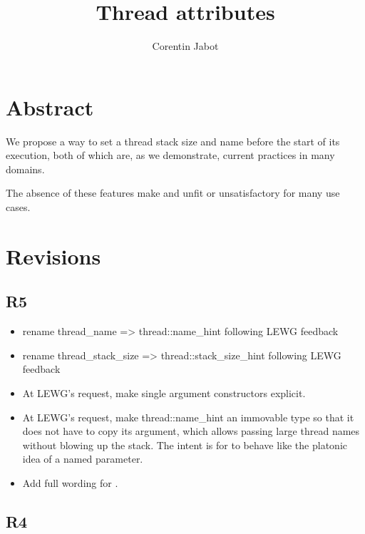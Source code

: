 \documentclass{wg21}
\title{Thread attributes}
\author{Corentin Jabot}{corentin.jabot@gmail.com}
\begin{document}
\maketitle

\setlength{\arrayrulewidth}{0.2mm}
\setlength{\tabcolsep}{8pt}
\renewcommand{\arraystretch}{1.}

\def\changemargin#1#2{\list{}{\rightmargin#2\leftmargin#1}\item[]}
\let\endchangemargin=\endlist
\setlength\extrarowheight{5pt}


\section{Abstract}

We propose a way to set a thread stack size and name before the start of its execution, both of which are,
as we demonstrate, current practices in many domains.

The absence of these features make  and  unfit or unsatisfactory for many use cases.

\section{Revisions}

\subsection{R5}

\begin{itemize}
\item rename thread_name => thread::name_hint following LEWG feedback
\item rename thread_stack_size => thread::stack_size_hint following LEWG feedback
\item At LEWG's request, make single argument constructors explicit.
\item At LEWG's request, make thread::name_hint an immovable type so that it does not have to copy its argument, which allows passing large thread names without blowing up the stack.
      The intent is for  to behave like the platonic idea of a named parameter.
\item Add full wording for .
\end{itemize}

\subsection{R4}
\end{document}
